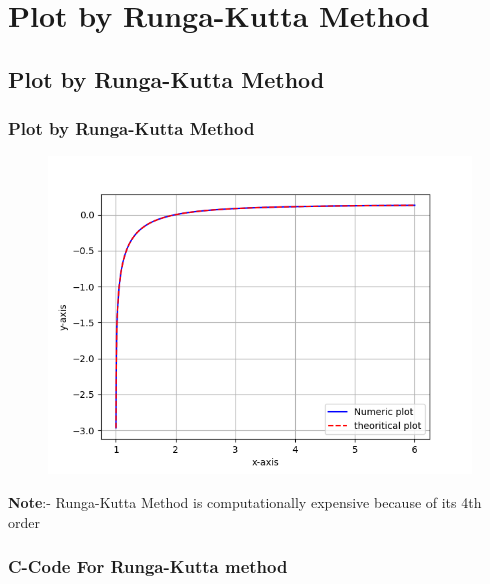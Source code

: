 \documentclass{beamer}
\theoremstyle{remark}
\numberwithin{equation}{section}
\begin{document}
\section{Plot by Runga-Kutta Method}
\subsection{Plot by Runga-Kutta Method}
\begin{frame}
\frametitle{Plot by Runga-Kutta Method}

\begin{figure}[h!]
   \centering
   \includegraphics[width=0.7\linewidth]{figs/Figure_1.png}
   \label{Graph by Runga-Kutta Method}
\end{figure}
\textbf{Note}:- Runga-Kutta Method is computationally expensive because of its 4th order

\end{frame}
\begin{frame}
\frametitle{C-Code For Runga-Kutta  method}


\end{frame}
\end{document}
